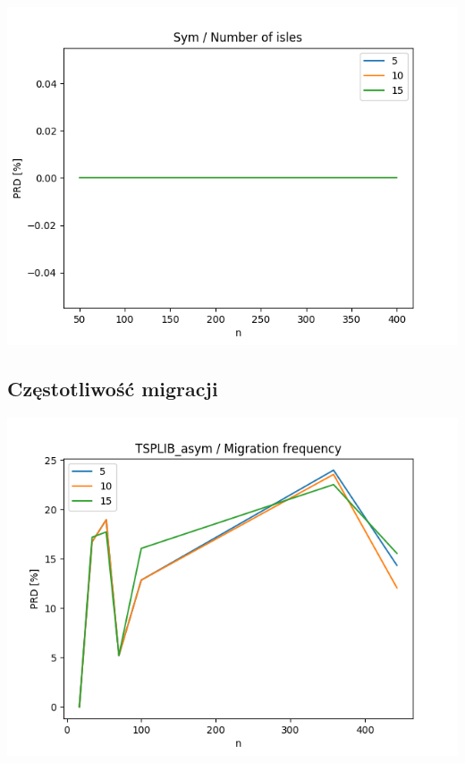 \documentclass{article}
\begin{document}
\begin{center}
\includegraphics[width=\textwidth, 
                   height = 0.4\textheight, 
                   keepaspectratio]
                  {plots/sym_10_isles} 
\end{center}


\subsection{Częstotliwość migracji}

\begin{center}
\includegraphics[width=\textwidth, 
                   height = 0.4\textheight, 
                   keepaspectratio]
                  {plots/tsplib_asym_11_migration_freq} 
\end{center}
\end{document}
